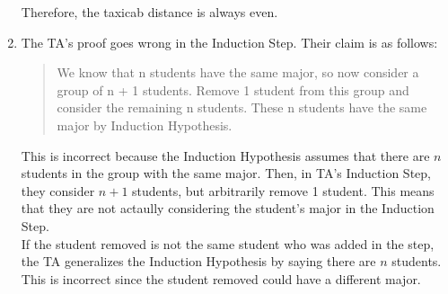 \documentclass[a4paper]{article}
\begin{document}
\begin{enumerate}
        Therefore, the taxicab distance is always even. \\

        \newpage
        \item The TA's proof goes wrong in the Induction Step. Their claim is as follows:

        \begin{quote}
        We know that n students have the same major, so now consider a group of n + 1 students. Remove 1 student from this group and consider the remaining n students. These n students have the same major by Induction Hypothesis.
        \end{quote}

        This is incorrect because the Induction Hypothesis assumes that there are $n$ students in the group with the same major. Then, in TA's Induction Step, they consider $n+1$ students, but arbitrarily remove 1 student. This means that they are not actaully considering the student's major in the Induction Step. \\
        
        If the student removed is not the same student who was added in the step, the TA generalizes the Induction Hypothesis by saying there are $n$ students. This is incorrect since the student removed could have a different major. \\
    \end{enumerate}

\newpage
\end{document}
